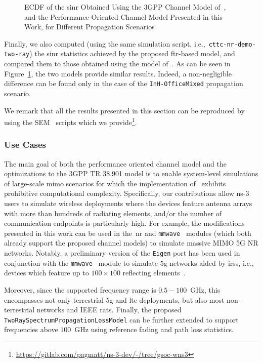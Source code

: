 \begin{figure}
    \centering 
    \setlength{}
    \setlength{}
    
    \caption{ECDF of the \gls{sinr} Obtained Using the 3GPP Channel Model of~\cite{TR38901}, and the Performance-Oriented Channel Model Presented in this Work, for Different Propagation Scenarios}
    \label{fig:accuracy}
\end{figure}

Finally, we also computed (using the same simulation script, i.e.,~\texttt{cttc-\-nr-\-demo-\-two-\-ray}) the \gls{sinr} statistics achieved by the proposed \gls{ftr}-based model, and compared them to those obtained using the model of~\cite{tommaso:20}. As can be seen in Figure~\ref{fig:accuracy}, the two models provide similar results. Indeed, a non-negligible difference can be found only in the case of the \texttt{InH-OfficeMixed} propagation scenario.

We remark that all the results presented in this section can be reproduced by using the SEM~\cite{magrin2019simulation} scripts which we provide\footnote{\url{https://gitlab.com/pagmatt/ns-3-dev/-/tree/gsoc-wns3}}.

\subsubsection{Use Cases}

The main goal of both the performance oriented channel model and the optimizations to the 3GPP TR 38.901 model is to enable system-level
simulations of large-scale \gls{mimo} scenarios for which the implementation of~\cite{tommaso:20} exhibits prohibitive computational complexity. Specifically, our contributions allow ns-3 users to simulate wireless deployments where the devices feature antenna arrays with more than hundreds of radiating elements, and/or the number of communication endpoints is particularly high. For example, the modifications presented in this work can be used in the~\gls{nr} and \texttt{mmwave}~\cite{mezzavilla2018end} modules (which both already support the proposed channel models) to simulate massive MIMO 5G NR networks. 
Notably, a preliminary version of the \texttt{Eigen} port has been used in conjunction with the \texttt{mmwave}~\cite{mezzavilla2018end} module to simulate \gls{5g} networks aided by \glspl{irs}, i.e., devices which feature up to $100 \times 100$ reflecting elements~\cite{pagin2022}. 

Moreover, since the supported frequency range is $0.5 - 100$~GHz, this encompasses not only terrestrial \gls{5g} and \gls{lte} deployments, but also most non-terrestrial networks and IEEE \glspl{rat}. Finally, the proposed \texttt{Two\-Ray\-Spectrum\-Propagation\-Loss\-Model} can be further extended to support frequencies above $100$~GHz using reference fading and path loss statistics.

